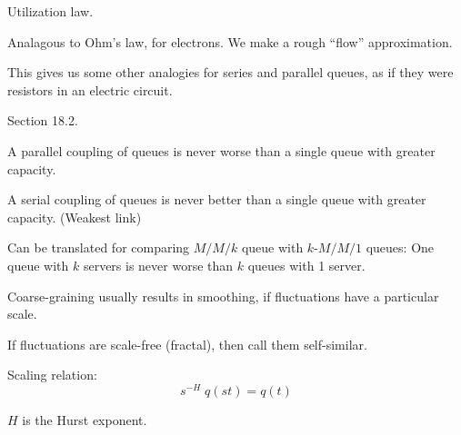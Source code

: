 \documentclass{slides}
\begin{document}

Utilization law.

Analagous to Ohm's law, for electrons. We make a rough ``flow'' approximation.

This gives us some other analogies for series and parallel queues,
as if they were resistors in an electric circuit.


Section 18.2.

A parallel coupling of queues is never worse than a single queue with greater
capacity. 

A serial coupling of queues is never better than a single queue with greater
capacity. (Weakest link)

Can be translated for comparing $M/M/k$ queue with $k$-$M/M/1$ queues:
One queue with $k$ servers is never worse than $k$ queues with 1 server.


Coarse-graining usually results in smoothing, if
 fluctuations have a particular scale.

If fluctuations are scale-free (fractal), then call them self-similar.

Scaling relation:
$$
s^{-H}\; q(st) = q(t)
$$

$H$ is the Hurst exponent.
\end{document}
